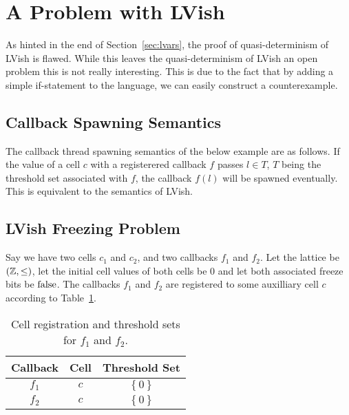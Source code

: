 
\section{A Problem with LVish}%
\label{sec:a_problem_of_lvish}

As hinted in the end of Section~\ref{sec:lvars}, the proof of quasi-determinism
of LVish is flawed. While this leaves the quasi-determinism of LVish an open
problem this is not really interesting. This is due to the fact that by adding a
simple if-statement to the language, we can easily construct a counterexample.

\subsection{Callback Spawning Semantics}%
\label{sub:callback_spawning_semantics_lvish}

The callback thread spawning semantics of the below example are as follows. If
the value of a cell $c$ with a registerered callback $f$ passes $l \in T$, $T$
being the threshold set associated with $f$, the callback $f(l)$ will be spawned
eventually. This is equivalent to the semantics of LVish.


\subsection{LVish Freezing Problem}%
\label{sub:lvish_freezing_problem}

Say we have two cells $c_1$ and $c_2$, and two callbacks $f_1$ and $f_2$. Let the
lattice be $(\mathbb{Z}, \leq)$, let the initial cell values of both cells be 
$0$ and let both associated freeze bits be $\mathrm{false}$. The
callbacks $f_1$ and $f_2$ are registered to some auxilliary cell $c$ according to
Table~\ref{tab:cellreg}.

\begin{table}
  \centering
  \begin{tabular}{c|c|c}
    Callback & Cell & Threshold Set \\
    \hline
    $f_1$ & $c$ & $\left\{ 0 \right\}$ \\
    $f_2$ & $c$ & $\left\{ 0 \right\}$ \\
  \end{tabular}
  \caption{Cell registration and threshold sets for $f_1$ and $f_2$.}
  \label{tab:cellreg}
\end{table}

